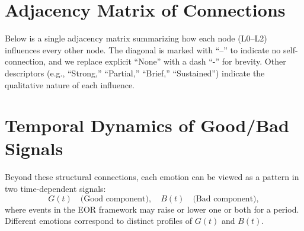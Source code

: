 \documentclass[11pt]{article}
\begin{document}
\section{Adjacency Matrix of Connections}
\label{sec:matrix}
Below is a single adjacency matrix summarizing how each node (L0--L2) influences every other node. The diagonal is marked with “--” to indicate no self-connection, and we replace explicit “None” with a dash “-” for brevity. Other descriptors (e.g., “Strong,” “Partial,” “Brief,” “Sustained”) indicate the qualitative nature of each influence.

\begin{table}[htbp]
\centering
\renewcommand{\arraystretch}{1.15}
\caption{Adjacency matrix for L0--L2 nodes. Each cell indicates the qualitative nature of influence. The diagonal is ``--'' to denote no self-connections.}
\label{tab:adjacency-matrix}
\end{table}

\section{Temporal Dynamics of Good/Bad Signals}
\label{sec:dynamics}
Beyond these structural connections, each emotion can be viewed as a pattern in two time-dependent signals:
\[
G(t) \quad\text{(Good component)}, 
\quad 
B(t) \quad\text{(Bad component)},
\]
where events in the EOR framework may raise or lower one or both for a period. Different emotions correspond to distinct profiles of \(G(t)\) and \(B(t)\).
\end{document}
